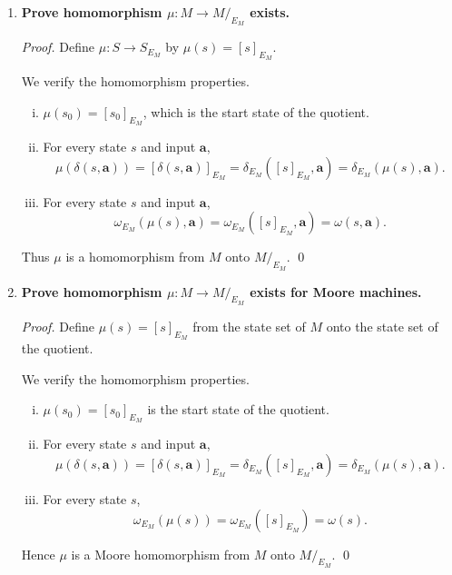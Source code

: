 \begin{enumerate}[{7.}1.]
\begin{enumerate}[(a)]
  \item \textbf{Homomorphism is not an equivalence relation:}  It is not
  symmetric.  Let
  \[
    A=\langle\{\pmb{a}\},\{\pmb{0}\},\{r_0,r_1\},r_0,\delta_A,\omega_A\rangle
  \]
  with
  \[
    \omega_A(r_0)=\omega_A(r_1)=\pmb{0},\qquad
    \delta_A(r_0,\pmb{a})=r_1,\qquad
    \delta_A(r_1,\pmb{a})=r_1,
  \]
  and let
  \[
    B=\langle\{\pmb{a}\},\{\pmb{0}\},\{s_0\},s_0,\delta_B,\omega_B\rangle
  \]
  with
  \[
    \omega_B(s_0)=\pmb{0},\qquad \delta_B(s_0,\pmb{a})=s_0.
  \]
  The map $\mu(r_0)=\mu(r_1)=s_0$ is a homomorphism $A\to B$.  But there is no
  homomorphism $B\to A$: any such map must send $s_0$ to the start state $r_0$,
  and then
  \[
    \mu(\delta_B(s_0,\pmb{a}))=\mu(s_0)=r_0
  \]
  would have to equal
  \[
    \delta_A(r_0,\pmb{a})=r_1,
  \]
  which is impossible.  So homomorphism is not symmetric, and therefore not an
  equivalence relation.
\end{enumerate}

\item \textbf{Prove homomorphism $\mu:M\to M/_{E_M}$ exists.}

\begin{proof}
Define $\mu:S\to S_{E_M}$ by $\mu(s)=[s]_{E_M}$.

We verify the homomorphism properties.
\begin{enumerate}[(i)]
  \item $\mu(s_0)=[s_0]_{E_M}$, which is the start state of the quotient.
  \item For every state $s$ and input $\pmb{a}$,
  \[
    \mu(\delta(s,\pmb{a}))
    =[\delta(s,\pmb{a})]_{E_M}
    =\delta_{E_M}([s]_{E_M},\pmb{a})
    =\delta_{E_M}(\mu(s),\pmb{a}).
  \]
  \item For every state $s$ and input $\pmb{a}$,
  \[
    \omega_{E_M}(\mu(s),\pmb{a})
    =\omega_{E_M}([s]_{E_M},\pmb{a})
    =\omega(s,\pmb{a}).
  \]
\end{enumerate}
Thus $\mu$ is a homomorphism from $M$ onto $M/_{E_M}$. \qed
\end{proof}

\item \textbf{Prove homomorphism $\mu:M\to M/_{E_M}$ exists for Moore machines.}

\begin{proof}
Define $\mu(s)=[s]_{E_M}$ from the state set of $M$ onto the state set of the
quotient.

We verify the homomorphism properties.
\begin{enumerate}[(i)]
  \item $\mu(s_0)=[s_0]_{E_M}$ is the start state of the quotient.
  \item For every state $s$ and input $\pmb{a}$,
  \[
    \mu(\delta(s,\pmb{a}))
    =[\delta(s,\pmb{a})]_{E_M}
    =\delta_{E_M}([s]_{E_M},\pmb{a})
    =\delta_{E_M}(\mu(s),\pmb{a}).
  \]
  \item For every state $s$,
  \[
    \omega_{E_M}(\mu(s))
    =\omega_{E_M}([s]_{E_M})
    =\omega(s).
  \]
\end{enumerate}
Hence $\mu$ is a Moore homomorphism from $M$ onto $M/_{E_M}$. \qed
\end{proof}


\end{enumerate}
